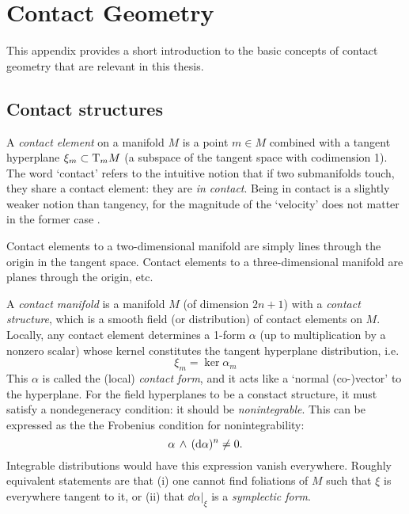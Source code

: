 \chapter{Contact Geometry}
\label{app:contact_geometry}
This appendix provides a short introduction to the basic concepts of contact geometry that are relevant in this thesis.

\section{Contact structures}
\label{sec:contact_structures}
A \emph{contact element} on a manifold \(M\) is a point \(m \in M\) combined with a tangent hyperplane \(\xi_m \subset \mathrm{T}_{m} M\) (a subspace of the tangent space  with codimension 1). The word `contact' refers to the intuitive notion that if two submanifolds touch, they share a contact element: they are \emph{in contact}. Being in contact is a slightly weaker notion than tangency, for the magnitude of the `velocity' does not matter in the former case \cite{Cannas2001}.

Contact elements to a two-dimensional manifold are simply lines through the origin in the tangent space. Contact elements to a three-dimensional manifold are planes through the origin, etc.

A \emph{contact manifold} is a manifold \(M\) (of dimension \(2n+1\)) with a \emph{contact structure}, which is a smooth field (or distribution) of contact elements on \(M\). Locally, any contact element determines a 1-form \(\alpha\) (up to multiplication by a nonzero scalar) whose kernel constitutes the tangent hyperplane distribution, i.e. 
\begin{equation}
    \xi_m = \ker \alpha_m
    \label{eq:contact_form}
\end{equation}
This \(\alpha\) is called the (local) \emph{contact form}, and it acts like a `normal (co-)vector' to the hyperplane. For the field hyperplanes to be a constact structure, it must satisfy a nondegeneracy condition: it should be \emph{nonintegrable}. This can be expressed as the the Frobenius condition for nonintegrability: \cite{Cannas2001,Abraham1978,Arnold1989}
\begin{equation}
      \alpha\,\wedge\,(\dd{\alpha})^n  \neq 0.
\end{equation}
Integrable distributions would have this expression vanish everywhere. Roughly equivalent statements are that (i) one cannot find foliations of \(M\) such that \(\xi\) is everywhere tangent to it, or (ii) that \(\dd{\alpha}\vert_\xi\) is a \emph{symplectic form}. 

